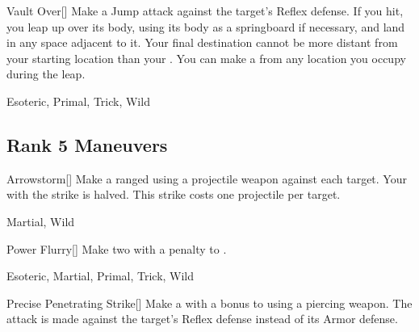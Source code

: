 \lowercase{\hypertarget{maneuver:Vault Over}{}}\label{maneuver:Vault Over}
\hypertarget{maneuver:Vault Over}{}
\begin{freeability}[Rank 4]{Vault Over}[]
Make a Jump attack against the target's Reflex defense.
If you hit, you leap up over its body, using its body as a springboard if necessary, and land in any space adjacent to it.
Your final destination cannot be more distant from your starting location than your .
You can make a  from any location you occupy during the leap.


 Esoteric, Primal, Trick, Wild
\end{freeability}
\vspace{0.25em}


\subsection{Rank 5 Maneuvers}

\lowercase{\hypertarget{maneuver:Arrowstorm}{}}\label{maneuver:Arrowstorm}
\hypertarget{maneuver:Arrowstorm}{}
\begin{freeability}[Rank 5]{Arrowstorm}[]
Make a ranged  using a projectile weapon against each target.
Your  with the strike is halved.
This strike costs one projectile per target.


 Martial, Wild
\end{freeability}
\vspace{0.25em}



\lowercase{\hypertarget{maneuver:Power Flurry}{}}\label{maneuver:Power Flurry}
\hypertarget{maneuver:Power Flurry}{}
\begin{freeability}[Rank 5]{Power Flurry}[]
Make two  with a  penalty to .


 Esoteric, Martial, Primal, Trick, Wild
\end{freeability}
\vspace{0.25em}



\lowercase{\hypertarget{maneuver:Precise Penetrating Strike}{}}\label{maneuver:Precise Penetrating Strike}
\hypertarget{maneuver:Precise Penetrating Strike}{}
\begin{freeability}[Rank 5]{Precise Penetrating Strike}[]
Make a  with a  bonus to  using a piercing weapon.
The attack is made against the target's Reflex defense instead of its Armor defense.


\end{freeability}
\vspace{0.25em}



